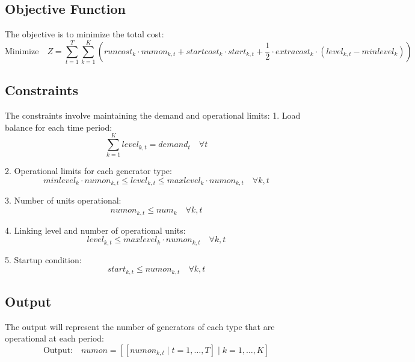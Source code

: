 \documentclass{article}
\begin{document}
\subsection*{Objective Function}

The objective is to minimize the total cost:
\[
\text{Minimize} \quad Z = \sum_{t=1}^{T} \sum_{k=1}^{K} \left( runcost_k \cdot numon_{k, t} + startcost_k \cdot start_{k, t} + \frac{1}{2} \cdot extracost_k \cdot (level_{k, t} - minlevel_k) \right)
\]

\subsection*{Constraints}

The constraints involve maintaining the demand and operational limits:
1. Load balance for each time period:
\[
\sum_{k=1}^{K} level_{k, t} = demand_t \quad \forall t
\]

2. Operational limits for each generator type:
\[
minlevel_k \cdot numon_{k, t} \leq level_{k, t} \leq maxlevel_k \cdot numon_{k, t} \quad \forall k, t
\]

3. Number of units operational:
\[
numon_{k, t} \leq num_k \quad \forall k, t
\]

4. Linking level and number of operational units:
\[
level_{k, t} \leq maxlevel_k \cdot numon_{k, t} \quad \forall k, t
\]

5. Startup condition:
\[
start_{k, t} \leq numon_{k, t} \quad \forall k, t
\]

\subsection*{Output}

The output will represent the number of generators of each type that are operational at each period:
\[
\text{Output:} \quad numon = \left[ \left[numon_{k, t} \; | \; t = 1, \ldots, T \right] \; | \; k = 1, \ldots, K \right]
\]
\end{document}
